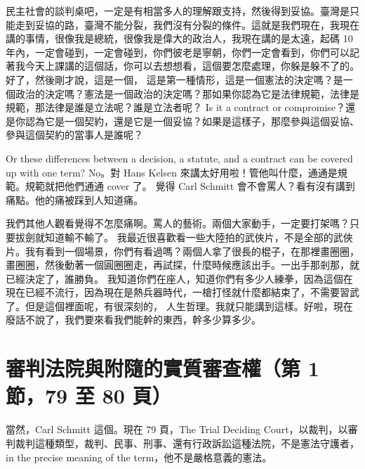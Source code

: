 \hypertarget{w05:cue:242}{}民主社會的談判桌吧，一定是有相當多人的理解跟支持，然後得到妥協。臺灣是只能走到妥協的路，臺灣不能分裂，我們沒有分裂的條件。這就是我們現在，我現在講的事情，很像我是總統，很像我是偉大的政治人，我現在講的是太遠，起碼 10 年內，一定會碰到，一定會碰到，你們彼老是寧朝，你們一定會看到，你們可以記著我今天上課講的這個話，你可以去想想看，這個要怎麼處理，你躲是躲不了的。好了，然後剛才說，這是一個，
\hypertarget{w05:cue:243}{}這是第一種情形，這是一個憲法的決定嗎？是一個政治的決定嗎？憲法是一個政治的決定嗎？那如果你認為它是法律規範，法律是規範，那法律是誰是立法呢？誰是立法者呢？
\hypertarget{w05:cue:244}{}Is it a contract or compromise？還是你認為它是一個契約，還是它是一個妥協？如果是這樣子，那麼參與這個妥協、參與這個契約的當事人是誰呢？

\hypertarget{w05:cue:245}{}Or these differences between a decision, a statute, and a contract can be covered up with one term?
\hypertarget{w05:cue:246}{}No。對 Hans Kelsen 來講太好用啦！管他叫什麼，通通是規範。規範就把他們通通 cover 了。
\hypertarget{w05:cue:247}{}覺得 Carl Schmitt 會不會罵人？看有沒有講到痛點。他的痛被踩到人知道痛。

\hypertarget{w05:cue:248}{}我們其他人觀看覺得不怎麼痛啊。罵人的藝術。兩個大家動手，一定要打架嗎？只要拔劍就知道輸不輸了。
\hypertarget{w05:cue:249}{}我最近很喜歡看一些大陸拍的武俠片，不是全部的武俠片。我有看到一個場景，你們有看過嗎？兩個人拿了很長的棍子，在那裡畫圈圈，畫圈圈，然後動著一個圓圈圈走，再試探，什麼時候應該出手。一出手那剎那，就已經決定了，誰勝負。
\hypertarget{w05:cue:250}{}我知道你們在座人，知道你們有多少人練拳，因為這個在現在已經不流行，因為現在是熱兵器時代，一槍打怪就什麼都結束了，不需要習武了。但是這個裡面呢，有很深刻的，
\hypertarget{w05:cue:251}{}人生哲理。我就只能講到這樣。好啦，現在廢話不說了，我們要來看我們能幹的東西，幹多少算多少。

\section{審判法院與附隨的實質審查權（第 1 節，79 至 80 頁）}

\hypertarget{w05:cue:252}{}當然，Carl Schmitt 這個。現在 79 頁，The Trial Deciding Court，以裁判，以審判裁判這種類型，裁判、民事、刑事、還有行政訴訟這種法院，不是憲法守護者，in the precise meaning of the term，他不是嚴格意義的憲法。

